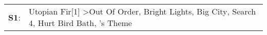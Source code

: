 \begin{supertabular}{p{0.03\textwidth}p{0.92\textwidth}}
 \textbf{S1}:  &  Utopian Fir[1]\textsuperscript{} \textgreater \enspace Out Of Order\textsuperscript{}, \enspace Bright Lights, Big City\textsuperscript{}, \enspace Search 4\textsuperscript{}, \enspace Hurt Bird Bath\textsuperscript{}, 's Theme\textsuperscript{}  \enspace  \\
\end{supertabular}
